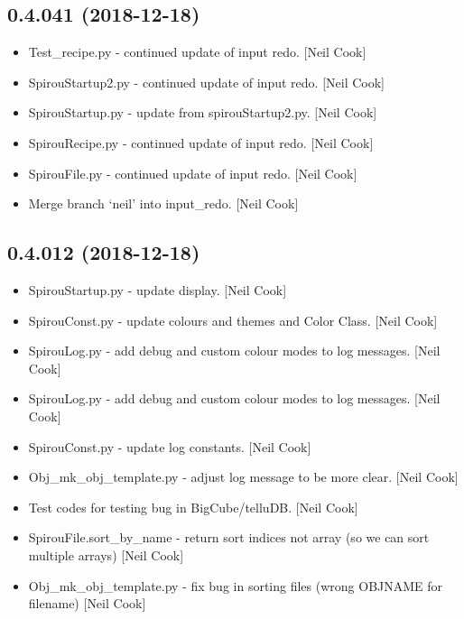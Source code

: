 \documentclass[a4paper,10pt,english]{report}
\begin{document}
\subsection{0.4.041 (2018-12-18)}
\label{\detokenize{misc/changelog:id225}}\begin{itemize}
\item {} 
Test\_recipe.py - continued update of input redo. {[}Neil Cook{]}

\item {} 
SpirouStartup2.py - continued update of input redo. {[}Neil Cook{]}

\item {} 
SpirouStartup.py - update from spirouStartup2.py. {[}Neil Cook{]}

\item {} 
SpirouRecipe.py - continued update of input redo. {[}Neil Cook{]}

\item {} 
SpirouFile.py - continued update of input redo. {[}Neil Cook{]}

\item {} 
Merge branch ‘neil’ into input\_redo. {[}Neil Cook{]}

\end{itemize}


\subsection{0.4.012 (2018-12-18)}
\label{\detokenize{misc/changelog:id226}}\begin{itemize}
\item {} 
SpirouStartup.py - update display. {[}Neil Cook{]}

\item {} 
SpirouConst.py - update colours and themes and Color Class. {[}Neil
Cook{]}

\item {} 
SpirouLog.py - add debug and custom colour modes to log messages.
{[}Neil Cook{]}

\item {} 
SpirouLog.py - add debug and custom colour modes to log messages.
{[}Neil Cook{]}

\item {} 
SpirouConst.py - update log constants. {[}Neil Cook{]}

\item {} 
Obj\_mk\_obj\_template.py - adjust log message to be more clear. {[}Neil
Cook{]}

\item {} 
Test codes for testing bug in BigCube/telluDB. {[}Neil Cook{]}

\item {} 
SpirouFile.sort\_by\_name - return sort indices not array (so we can
sort multiple arrays) {[}Neil Cook{]}

\item {} 
Obj\_mk\_obj\_template.py - fix bug in sorting files (wrong OBJNAME for
filename) {[}Neil Cook{]}

\end{itemize}
\end{document}
